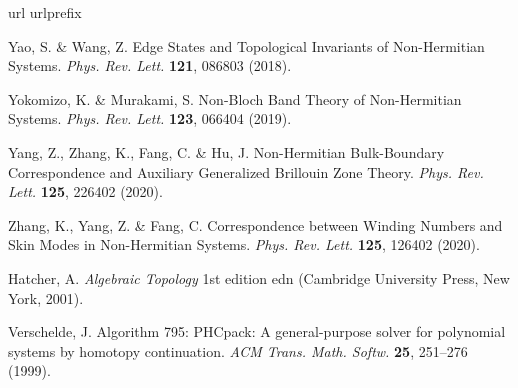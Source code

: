 \begin{thebibliography}{10}
\expandafter\ifx\csname url\endcsname\relax
  \def\url#1{\burl{#1}}\fi
\expandafter\ifx\csname urlprefix\endcsname\relax\def\urlprefix{URL }\fi
\providecommand{\bibinfo}[2]{#2}
\providecommand{\eprint}[2][]{\url{#2}}
\providecommand{\doi}[1]{\url{https://doi.org/#1}}
\bibcommenthead

\bibinfo{author}{Yao, S.} \& \bibinfo{author}{Wang, Z.}
\newblock \bibinfo{title}{Edge {{States}} and {{Topological Invariants}} of {{Non-Hermitian Systems}}}.
\newblock \emph{\bibinfo{journal}{Phys. Rev. Lett.}} \textbf{\bibinfo{volume}{121}}, \bibinfo{pages}{086803} (\bibinfo{year}{2018}).

\bibinfo{author}{Yokomizo, K.} \& \bibinfo{author}{Murakami, S.}
\newblock \bibinfo{title}{Non-{{Bloch Band Theory}} of {{Non-Hermitian Systems}}}.
\newblock \emph{\bibinfo{journal}{Phys. Rev. Lett.}} \textbf{\bibinfo{volume}{123}}, \bibinfo{pages}{066404} (\bibinfo{year}{2019}).

\bibinfo{author}{Yang, Z.}, \bibinfo{author}{Zhang, K.}, \bibinfo{author}{Fang, C.} \& \bibinfo{author}{Hu, J.}
\newblock \bibinfo{title}{Non-{{Hermitian Bulk-Boundary Correspondence}} and {{Auxiliary Generalized Brillouin Zone Theory}}}.
\newblock \emph{\bibinfo{journal}{Phys. Rev. Lett.}} \textbf{\bibinfo{volume}{125}}, \bibinfo{pages}{226402} (\bibinfo{year}{2020}).

\bibinfo{author}{Zhang, K.}, \bibinfo{author}{Yang, Z.} \& \bibinfo{author}{Fang, C.}
\newblock \bibinfo{title}{Correspondence between {{Winding Numbers}} and {{Skin Modes}} in {{Non-Hermitian Systems}}}.
\newblock \emph{\bibinfo{journal}{Phys. Rev. Lett.}} \textbf{\bibinfo{volume}{125}}, \bibinfo{pages}{126402} (\bibinfo{year}{2020}).

\bibinfo{author}{Hatcher, A.}
\newblock \emph{\bibinfo{title}{Algebraic {{Topology}}}} \bibinfo{edition}{1st edition} edn (\bibinfo{publisher}{Cambridge University Press}, \bibinfo{address}{New York}, \bibinfo{year}{2001}).

\bibinfo{author}{Verschelde, J.}
\newblock \bibinfo{title}{Algorithm 795: {{PHCpack}}: A general-purpose solver for polynomial systems by homotopy continuation}.
\newblock \emph{\bibinfo{journal}{ACM Trans. Math. Softw.}} \textbf{\bibinfo{volume}{25}}, \bibinfo{pages}{251--276} (\bibinfo{year}{1999}).


\end{thebibliography}
